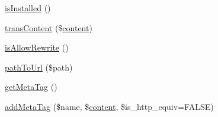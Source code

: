 \begin{DoxyCompactItemize}
\item 
\hyperlink{classContext_a5a8714e3a0f9d4722a31ce73017c6613}{is\-Installed} ()
\item 
\hyperlink{classContext_a4767b003bd726a994b1bf6bf68a3bb7e}{trans\-Content} (\$\hyperlink{classcontent}{content})
\item 
\hyperlink{classContext_aa11482b69f0892e9e8013e08c9914ff4}{is\-Allow\-Rewrite} ()
\item 
\hyperlink{classContext_a6012ceb6e62fc99b0e2b24e475ba4da7}{path\-To\-Url} (\$path)
\item 
\hyperlink{classContext_a8ee4ad4396e92a54d2aa7d079771619f}{get\-Meta\-Tag} ()
\item 
\hyperlink{classContext_aeae29df3bedc1f90a497d34543a08f7f}{add\-Meta\-Tag} (\$name, \$\hyperlink{classcontent}{content}, \$is\-\_\-http\-\_\-equiv=F\-A\-L\-S\-E)
\end{DoxyCompactItemize}
